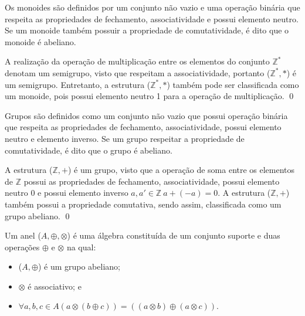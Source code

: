 \begin{definition}[monoide]
    Os monoides são definidos por um conjunto não vazio e uma operação binária que respeita as propriedades de fechamento, associatividade e possui elemento neutro. Se um monoide também possuir a propriedade de comutatividade, é dito que o monoide é abeliano.
\end{definition}

    \begin{exemplo}
         A realização da operação de multiplicação entre os elementos do conjunto $\mathbb{Z}^{*}$ denotam um semigrupo, visto que respeitam a associatividade, portanto ($\mathbb{Z}^{*},*$) é um semigrupo. Entretanto, a estrutura ($\mathbb{Z}^{*},*$) também pode ser classificada como um monoide, pois possui elemento neutro 1 para a operação de multiplicação.
    \qed
    \end{exemplo}
    
    
\begin{definition}[grupo]
    Grupos são definidos como um  conjunto não vazio que possui operação binária que respeita as propriedades de fechamento, associatividade, possui elemento neutro e elemento inverso. Se um grupo respeitar a propriedade de comutatividade, é dito que o grupo é abeliano.
\end{definition}

    \begin{exemplo}
    \label{exemplo:grupo}
        A estrutura ($\mathbb{Z},+$) é um grupo, visto que a operação de soma entre os elementos de $\mathbb{Z}$ possui as propriedades de fechamento, associatividade, possui elemento neutro 0 e possui elemento inverso $a,a' \in \mathbb{Z}\ a + (-a) = 0$. A estrutura ($\mathbb{Z},+$) também possui a propriedade comutativa, sendo assim, classificada como um grupo abeliano. 
    \qed
    \end{exemplo}
    
\begin{definition}[anel]
    Um anel ($A, \oplus, \otimes$) é uma álgebra constituída de um conjunto suporte e duas operações $\oplus$ e $\otimes$ na qual:

    \begin{itemize}
        \item ($A , \oplus$) é um grupo abeliano;
    	\item $\otimes$ é associativo; e
    	\item $\forall a,b,c \in A (a \otimes (b \oplus c)) = ((a \otimes b) \oplus (a \otimes c))$.
    \end{itemize}
\end{definition}

